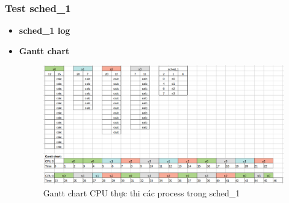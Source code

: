 \subsubsection{Test sched\_1}
\begin{itemize}
	\item \textbf{sched\_1 log}
		
	\item \textbf{Gantt chart}
		\begin{figure}[h!]
		    \centering
		    \includegraphics[width=16cm]{images/sched_1.png}
		    \caption{Gantt chart CPU thực thi các process trong sched\_1}
		    \label{fig:my_label}
		\end{figure}
\end{itemize}